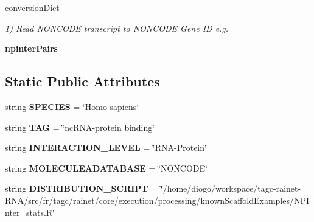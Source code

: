 \begin{DoxyCompactItemize}
\item 
\hyperlink{classNPInterPredictionValidation_1_1NPInterPredictionValidation_aacd479a71f1a21704b6f7ff636a20885}{conversion\-Dict}
\begin{DoxyCompactList}\small\item\em 1) Read N\-O\-N\-C\-O\-D\-E transcript to N\-O\-N\-C\-O\-D\-E Gene I\-D e.\-g. \end{DoxyCompactList}\item 
\hypertarget{classNPInterPredictionValidation_1_1NPInterPredictionValidation_a2243689b917c2f82402a4c122d885c6b}{{\bfseries npinter\-Pairs}}\label{classNPInterPredictionValidation_1_1NPInterPredictionValidation_a2243689b917c2f82402a4c122d885c6b}

\end{DoxyCompactItemize}
\subsection*{Static Public Attributes}
\begin{DoxyCompactItemize}
\item 
\hypertarget{classNPInterPredictionValidation_1_1NPInterPredictionValidation_a82c33fcd8060dca24186301456fed0b4}{string {\bfseries S\-P\-E\-C\-I\-E\-S} = \char`\"{}Homo sapiens\char`\"{}}\label{classNPInterPredictionValidation_1_1NPInterPredictionValidation_a82c33fcd8060dca24186301456fed0b4}

\item 
\hypertarget{classNPInterPredictionValidation_1_1NPInterPredictionValidation_a1c1d89a3c24de55afb59c256002cf837}{string {\bfseries T\-A\-G} = \char`\"{}nc\-R\-N\-A-\/protein binding\char`\"{}}\label{classNPInterPredictionValidation_1_1NPInterPredictionValidation_a1c1d89a3c24de55afb59c256002cf837}

\item 
\hypertarget{classNPInterPredictionValidation_1_1NPInterPredictionValidation_a303956a866c498dede129a9023d9ee2b}{string {\bfseries I\-N\-T\-E\-R\-A\-C\-T\-I\-O\-N\-\_\-\-L\-E\-V\-E\-L} = \char`\"{}R\-N\-A-\/Protein\char`\"{}}\label{classNPInterPredictionValidation_1_1NPInterPredictionValidation_a303956a866c498dede129a9023d9ee2b}

\item 
\hypertarget{classNPInterPredictionValidation_1_1NPInterPredictionValidation_a652f7fc9d8d84a08b76b83850cde11e1}{string {\bfseries M\-O\-L\-E\-C\-U\-L\-E\-A\-D\-A\-T\-A\-B\-A\-S\-E} = \char`\"{}N\-O\-N\-C\-O\-D\-E\char`\"{}}\label{classNPInterPredictionValidation_1_1NPInterPredictionValidation_a652f7fc9d8d84a08b76b83850cde11e1}

\item 
\hypertarget{classNPInterPredictionValidation_1_1NPInterPredictionValidation_adefdbbad85aed10014220645774c33f3}{string {\bfseries D\-I\-S\-T\-R\-I\-B\-U\-T\-I\-O\-N\-\_\-\-S\-C\-R\-I\-P\-T} = \char`\"{}/home/diogo/workspace/tagc-\/rainet-\/R\-N\-A/src/fr/tagc/rainet/core/execution/processing/known\-Scaffold\-Examples/N\-P\-Inter\-\_\-stats.\-R\char`\"{}}\label{classNPInterPredictionValidation_1_1NPInterPredictionValidation_adefdbbad85aed10014220645774c33f3}

\end{DoxyCompactItemize}


